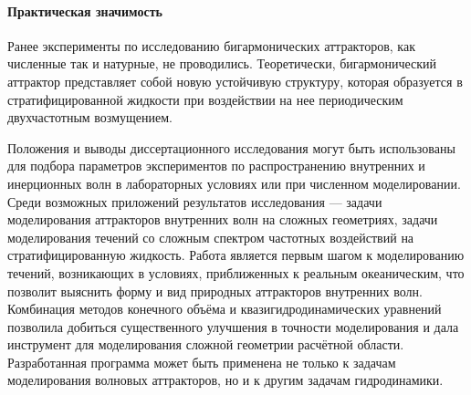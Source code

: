 \documentclass[utf8x]{G7-32} %
\begin{document}



\newpage
 
\paragraph{Практическая значимость} 

Ранее эксперименты по исследованию бигармонических аттракторов, как численные так и натурные, не проводились. Теоретически, бигармонический аттрактор представляет собой новую устойчивую структуру, которая образуется в стратифицированной жидкости при воздействии на нее периодическим двухчастотным возмущением.

Положения и выводы диссертационного исследования могут быть использованы для подбора параметров экспериментов по распространению внутренних и инерционных волн в лабораторных условиях или при численном моделировании. Среди возможных приложений результатов исследования — задачи моделирования аттракторов внутренних волн на сложных геометриях, задачи моделирования течений со сложным спектром частотных воздействий на стратифицированную жидкость. Работа является первым шагом к моделированию течений, возникающих в условиях, приближенных к реальным океаническим, что позволит выяснить форму и вид природных аттракторов внутренних волн. Комбинация методов конечного объёма и квазигидродинамических уравнений позволила добиться существенного улучшения в точности моделирования и дала инструмент для моделирования сложной геометрии расчётной области. Разработанная программа может быть применена не только к задачам моделирования волновых аттракторов, но и к другим задачам гидродинамики.
\end{document}
